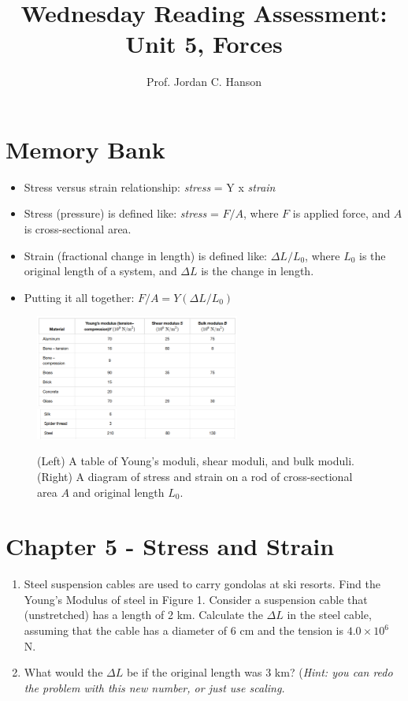 \documentclass{article}
\begin{document}
\title{Wednesday Reading Assessment: Unit 5, Forces}
\author{Prof. Jordan C. Hanson}

\maketitle

\section{Memory Bank}

\begin{itemize}
\item Stress versus strain relationship: \textit{stress} = Y x \textit{strain}
\item Stress (pressure) is defined like: \textit{stress} = $F/A$, where $F$ is applied force, and $A$ is cross-sectional area.
\item Strain (fractional change in length) is defined like: $\Delta L / L_{0}$, where $L_0$ is the original length of a system, and $\Delta L$ is the change in length.
\item Putting it all together: $F/A = Y (\Delta L/L_{0})$
\end{itemize}
\begin{figure}[ht]
\centering
\includegraphics[width=0.6\textwidth]{figures/modulus.png} \\
\includegraphics[width=0.6\textwidth]{figures/moduli2.png}
\caption{\label{fig:strain} (Left) A table of Young's moduli, shear moduli, and bulk moduli. (Right) A diagram of stress and strain on a rod of cross-sectional area $A$ and original length $L_0$.}
\end{figure}
\section{Chapter 5 - Stress and Strain}
\begin{enumerate}
\item Steel suspension cables are used to carry gondolas at ski resorts.  Find the Young's Modulus of steel in Figure 1.  Consider a suspension cable that (unstretched) has a length of 2 km. Calculate the $\Delta L$ in the steel cable, assuming that the cable has a diameter of 6 cm and the tension is $4.0 \times 10^6$ N. \\ \vspace{2cm}
\item What would the $\Delta L$ be if the original length was 3 km? (\textit{Hint: you can redo the problem with this new number, or just use scaling.}
\end{enumerate}
\end{document}
